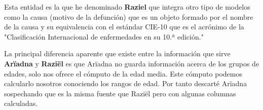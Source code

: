 Esta entidad es la que he denominado \textbf{Raziel} que integra otro tipo de modelos como la causa (motivo de la defunción) que es un objeto formado por el nombre de la causa y su equivalencia con el estándar \gls{CIE-10} que es el acrónimo de la "Clasificación Internacional de enfermedades en su 10.ª edición."

La principal diferencia aparente que existe entre la información que sirve \textbf{Arïadna} y \textbf{Raziël} es que Arïadna no guarda información acerca de los grupos de edades, solo nos ofrece el cómputo de la edad media. Este cómputo podemos calcularlo nosotros conociendo los rangos de edad. Por tanto descarté Arïadna sospechando que es la misma fuente que Raziël pero con algunas columnas calculadas.
